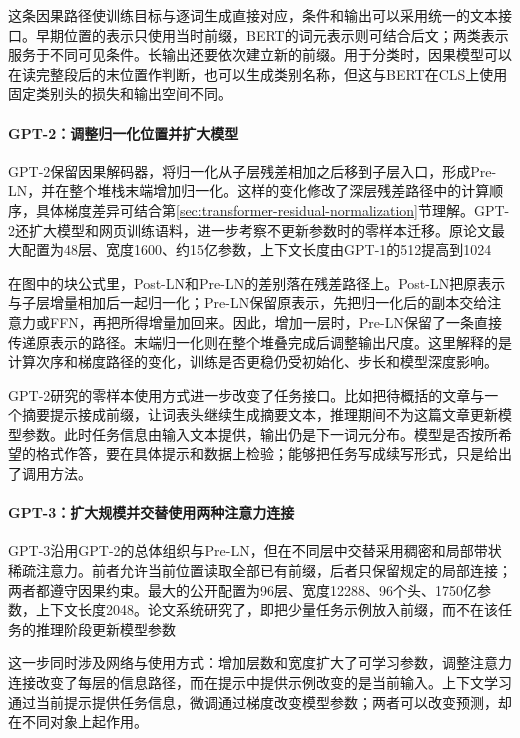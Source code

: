 这条因果路径使训练目标与逐词生成直接对应，条件和输出可以采用统一的文本接口。早期位置的表示只使用当时前缀，BERT的词元表示则可结合后文；两类表示服务于不同可见条件。长输出还要依次建立新的前缀。用于分类时，因果模型可以在读完整段后的末位置作判断，也可以生成类别名称，但这与BERT在CLS上使用固定类别头的损失和输出空间不同。

\paragraph{GPT-2：调整归一化位置并扩大模型}

GPT-2保留因果解码器，将归一化从子层残差相加之后移到子层入口，形成Pre-LN，并在整个堆栈末端增加归一化。这样的变化修改了深层残差路径中的计算顺序，具体梯度差异可结合第\ref{sec:transformer-residual-normalization}节理解。GPT-2还扩大模型和网页训练语料，进一步考察不更新参数时的零样本迁移。原论文最大配置为48层、宽度1600、约15亿参数，上下文长度由GPT-1的512提高到1024

在图中的块公式里，Post-LN和Pre-LN的差别落在残差路径上。Post-LN把原表示与子层增量相加后一起归一化；Pre-LN保留原表示，先把归一化后的副本交给注意力或FFN，再把所得增量加回来。因此，增加一层时，Pre-LN保留了一条直接传递原表示的路径。末端归一化则在整个堆叠完成后调整输出尺度。这里解释的是计算次序和梯度路径的变化，训练是否更稳仍受初始化、步长和模型深度影响。

GPT-2研究的零样本使用方式进一步改变了任务接口。比如把待概括的文章与一个摘要提示接成前缀，让词表头继续生成摘要文本，推理期间不为这篇文章更新模型参数。此时任务信息由输入文本提供，输出仍是下一词元分布。模型是否按所希望的格式作答，要在具体提示和数据上检验；能够把任务写成续写形式，只是给出了调用方法。

\paragraph{GPT-3：扩大规模并交替使用两种注意力连接}

GPT-3沿用GPT-2的总体组织与Pre-LN，但在不同层中交替采用稠密和局部带状稀疏注意力。前者允许当前位置读取全部已有前缀，后者只保留规定的局部连接；两者都遵守因果约束。最大的公开配置为96层、宽度12288、96个头、1750亿参数，上下文长度2048。论文系统研究了，即把少量任务示例放入前缀，而不在该任务的推理阶段更新模型参数

这一步同时涉及网络与使用方式：增加层数和宽度扩大了可学习参数，调整注意力连接改变了每层的信息路径，而在提示中提供示例改变的是当前输入。上下文学习通过当前提示提供任务信息，微调通过梯度改变模型参数；两者可以改变预测，却在不同对象上起作用。

